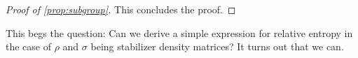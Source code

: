 \begin{proof}[Proof of \cref{prop:subgroup}]
  This concludes the proof.
\end{proof}
This begs the question: Can we derive a simple expression for relative entropy
in the case of $\rho$ and $\sigma$ being stabilizer density matrices?
It turns out that we can.

